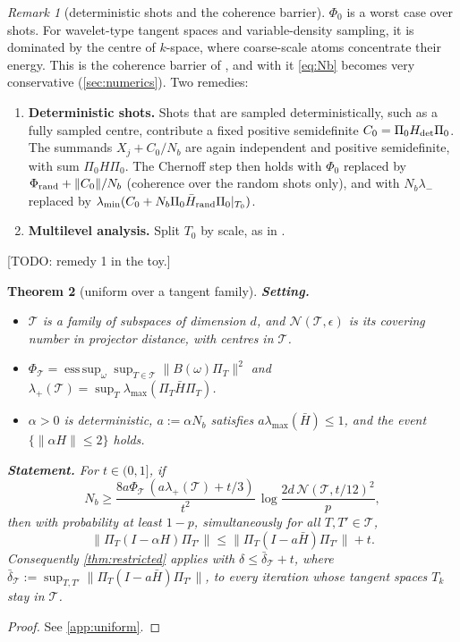 \documentclass[11pt]{article}
\newtheorem{theorem}{Theorem}[section]
\theoremstyle{definition}
\theoremstyle{remark}
\newtheorem{remark}[theorem]{Remark}
\newcommand{\norm}[1]{\lVert #1\rVert}
\newcommand{\lmin}{\lambda_{\min}}
\newcommand{\lmax}{\lambda_{\max}}
\newcommand{\Hb}{\bar H}
\newcommand{\T}{\mathcal T}
\newcommand{\todo}[1]{\textcolor{blue!70!black}{[TODO: #1]}}
\begin{document}
\begin{remark}[deterministic shots and the coherence barrier]\label{rem:coherence}
$\Phi_0$ is a worst case over shots. For wavelet-type tangent spaces and variable-density sampling, it is
dominated by the centre of $k$-space, where coarse-scale atoms concentrate their energy. This is the coherence
barrier of \cite{adcock2017breaking}, and with it \eqref{eq:Nb} becomes very conservative (\cref{sec:numerics}).
Two remedies:
\begin{enumerate}
\item \textbf{Deterministic shots.} Shots that are sampled deterministically, such as a fully sampled centre,
  contribute a fixed positive semidefinite $C_0=\Pi_0H_{\rm det}\Pi_0$. The summands $X_j+C_0/N_b$ are again
  independent and positive semidefinite, with sum $\Pi_0H\Pi_0$. The Chernoff step then holds with $\Phi_0$
  replaced by $\Phi_{\rm rand}+\norm{C_0}/N_b$ (coherence over the random shots only), and with $N_b\lambda_-$
  replaced by $\lmin(C_0+N_b\Pi_0\Hb_{\rm rand}\Pi_0|_{T_0})$.
\item \textbf{Multilevel analysis.} Split $T_0$ by scale, as in \cite{adcock2017breaking}.
\end{enumerate}
\todo{remedy 1 in the toy.}
\end{remark}

\begin{theorem}[uniform over a tangent family]\label{thm:uniform}
\textbf{Setting.}
\begin{itemize}
\item $\T$ is a family of subspaces of dimension $d$, and $\mathcal N(\T,\epsilon)$ is its covering number in
  projector distance, with centres in $\T$.
\item $\Phi_\T=\operatorname{ess\,sup}_\omega\sup_{T\in\T}\norm{B(\omega)\Pi_T}^2$ and
  $\lambda_+(\T)=\sup_T\lmax(\Pi_T\Hb\Pi_T)$.
\item $\alpha>0$ is deterministic, $a:=\alpha N_b$ satisfies $a\lmax(\Hb)\leq1$, and the event
  $\{\norm{\alpha H}\leq2\}$ holds.
\end{itemize}
\textbf{Statement.} For $t\in(0,1]$, if
\[
N_b\geq\frac{8a\Phi_\T\,(a\lambda_+(\T)+t/3)}{t^2}\,\log\frac{2d\,\mathcal N(\T,t/12)^2}{p},
\]
then with probability at least $1-p$, simultaneously for all $T,T'\in\T$,
\[
\norm{\Pi_T(I-\alpha H)\Pi_{T'}}\leq\norm{\Pi_T(I-a\Hb)\Pi_{T'}}+t .
\]
Consequently \cref{thm:restricted} applies with
$\delta\leq\bar\delta_\T+t$, where $\bar\delta_\T:=\sup_{T,T'}\norm{\Pi_T(I-a\Hb)\Pi_{T'}}$, to \emph{every} iteration whose
tangent spaces $T_k$ stay in $\T$.
\end{theorem}
\begin{proof}
See \cref{app:uniform}.
\end{proof}
\end{document}
